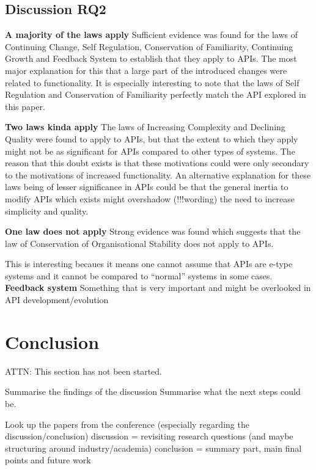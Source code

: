 \documentclass{sig-alternate}
\begin{document}
\newpage
\subsection{Discussion RQ2}

\noindent
\textbf{A majority of the laws apply  }
Sufficient evidence was found for the laws of Continuing Change, Self Regulation, Conservation of Familiarity, Continuing Growth and Feedback System to establish that they apply to APIs. The most major explanation for this that a large part of the introduced changes were related to functionality. It is especially interesting to note that the laws of Self Regulation and Conservation of Familiarity perfectly match the API explored in this paper. 

\smallskip \noindent
\textbf{Two laws kinda apply  }
The laws of Increasing Complexity and Declining Quality were found to apply to APIs, but that the extent to which they apply might not be as significant for APIs compared to other types of systems. The reason that this doubt exists is that these motivations could were only secondary to the motivations of increased functionality. An alternative explanation for these laws being of lesser significance in APIs could be that the general inertia to modify APIs which exists \cite{google_talk} \cite{mcdonnell2013empirical} \cite{robbes2012developers} \cite{henning2007api} might overshadow (!!!wording) the need to increase simplicity and quality. 


\smallskip \noindent
\textbf{One law does not apply}
Strong evidence was found which suggests that the law of Conservation of Organisational Stability does not apply to APIs. 


This is interesting becaues it means one cannot assume that APIs are e-type systems and it cannot be compared to ``normal'' systems in some cases. 
\smallskip \noindent
\textbf{Feedback system  }
Something that is very important and might be overlooked in API development/evolution

\newpage




\section{Conclusion} \label{conclusion}
ATTN: This section has not been started. 

Summarise the findings of the discussion
Summarise what the next steps could be.

Look up the papers from the conference (especially regarding the discussion/conclusion)
discussion = revisiting research questions (and maybe structuring around industry/academia)
conclusion = summary part, main final points and future work 
\end{document}
